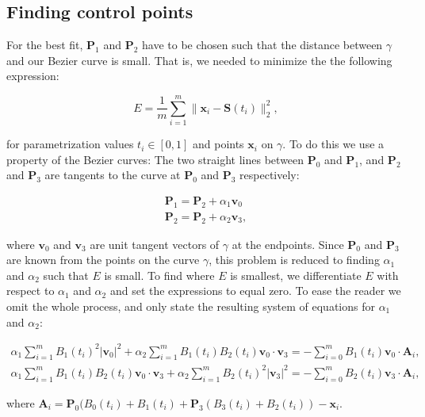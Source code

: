 \documentclass[10pt]{article}
\begin{document}
\subsection*{Finding control points}

For the best fit, $\mathbf{P}_1$ and $\mathbf{P}_2$ have to be chosen such that the distance between $\gamma$ and our Bezier curve is small. That is, we needed to minimize the the following expression:

\begin{equation}
E = \frac{1}{m} \sum_{i=1}^{m} \| \mathbf{x}_i - \mathbf{S}(t_i)\|^2_2,
\end{equation}

for parametrization values $t_i \in [ 0,1 ]$ and points $\mathbf{x}_i$ on $\gamma$. To do this we use a property of the Bezier curves: The two straight lines between $\mathbf{P}_0$ and $\mathbf{P}_1$, and $\mathbf{P}_2$ and $\mathbf{P}_3$ are tangents to the curve at $\mathbf{P}_0$ and $\mathbf{P}_3$ respectively:

\begin{align}
\mathbf{P}_1 = \mathbf{P}_2 + \alpha_1 \mathbf{v}_0 \\
\mathbf{P}_2 = \mathbf{P}_2 + \alpha_2 \mathbf{v}_3,
\end{align}

where $\mathbf{v}_0$ and $\mathbf{v}_3$ are unit tangent vectors of $\gamma$ at the endpoints. Since $\mathbf{P}_0$ and $\mathbf{P}_3$ are known from the points on the curve $\gamma$, this problem is reduced to finding $\alpha_1$ and $\alpha_2$ such that $E$ is small. To find where $E$ is smallest, we differentiate $E$ with respect to $\alpha_1$ and $\alpha_2$ and set the expressions to equal zero. To ease the reader we omit the whole process, and only state the resulting system of equations for $\alpha_1$ and $\alpha_2$:


\begin{align}
\alpha_1 \sum_{i = 1}^m B_1(t_i)^2 |\mathbf{v}_0|^2 + \alpha_2 \sum_{i = 1}^m B_1(t_i)B_2(t_i)\mathbf{v}_0 \cdot \mathbf{v}_3 
= - \sum_{i = 0}^m B_1(t_i) \mathbf{v}_0 \cdot \mathbf{A}_i, \\
\alpha_1 \sum_{i = 1}^m B_1(t_i)B_2(t_i)\mathbf{v}_0 \cdot \mathbf{v}_3 + \alpha_2 \sum_{i = 1}^m B_2(t_i)^2 |\mathbf{v}_3|^2 
= - \sum_{i = 0}^m B_2(t_i)\mathbf{v}_3 \cdot \mathbf{A}_i,
\end{align}

where $\mathbf{A}_i = \mathbf{P}_0(B_0(t_i) + B_1(t_i) + \mathbf{P}_3(B_3(t_i) + B_2(t_i)) - \mathbf{x}_i$.
\end{document}
